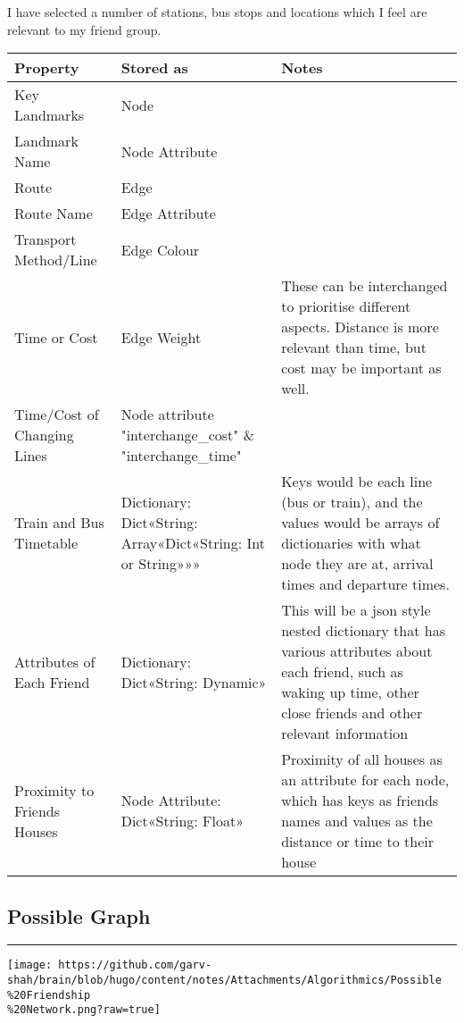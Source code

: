 \documentclass[
]{article}
\begin{document}
I have selected a number of stations, bus stops and locations which I
feel are relevant to my friend group.

\begin{longtable}[]{@{}lll@{}}
\toprule\noalign{}
Property & Stored as & Notes \\
\midrule\noalign{}
\endhead
\bottomrule\noalign{}
\endlastfoot
Key Landmarks & Node & \\
Landmark Name & Node Attribute & \\
Route & Edge & \\
Route Name & Edge Attribute & \\
Transport Method/Line & Edge Colour & \\
Time or Cost & Edge Weight & These can be interchanged to prioritise
different aspects. Distance is more relevant than time, but cost may be
important as well. \\
Time/Cost of Changing Lines & Node attribute "interchange\_cost" \&
"interchange\_time" & \\
Train and Bus Timetable & Dictionary: Dict«String: Array«Dict«String:
Int or String»»» & Keys would be each line (bus or train), and the
values would be arrays of dictionaries with what node they are at,
arrival times and departure times. \\
Attributes of Each Friend & Dictionary: Dict«String: Dynamic» & This
will be a json style nested dictionary that has various attributes about
each friend, such as waking up time, other close friends and other
relevant information \\
Proximity to Friends\textquotesingle{} Houses & Node Attribute:
Dict«String: Float» & Proximity of all houses as an attribute for each
node, which has keys as friends\textquotesingle{} names and values as
the distance or time to their house \\
\end{longtable}

\hypertarget{possible-graph}{%
\subsection{Possible Graph}\label{possible-graph}}

\begin{center}\rule{0.5\linewidth}{0.5pt}\end{center}

\texttt{[image: https://github.com/garv-shah/brain/blob/hugo/content/notes/Attachments/Algorithmics/Possible\\\%20Friendship\\\%20Network.png?raw=true]}
\end{document}

